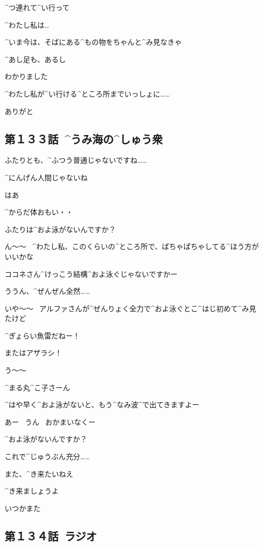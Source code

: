 \Sensei ^{つ}{連}れて^{い}{行}って

\Sensei ^{わたし}{私}は…

\Sensei ^{いま}{今}は、そばにある^{もの}{物}をちゃんと^{み}{見}なきゃ

\page[31]
\Sensei ^{あし}{足}も、あるし

\Alpha わかりました

\Alpha ^{わたし}{私}が^{い}{行}ける^{ところ}{所}までいっしょに……

\Sensei ありがと


\subsection{第１３３話\ ^{うみ}{海}の^{しゅう}{衆}}

\page[36]
\Kokone ふたりとも、^{ふつう}{普通}じゃないですね……

\Maruko ^{にんげん}{人間}じゃないね

\page[37]
\Alpha はあ

\Alpha ^{からだ}{体}おもい・・

\Makki ふたりは^{およ}{泳}がないんですか？

\Kokone ん〜〜
\ ^{わたし}{私}、このくらいの^{ところ}{所}で、ぱちゃぱちゃしてる^{ほう}{方}がいいかな

\Makki ココネさん^{けっこう}{結構}^{およ}{泳}ぐじゃないですかー

\Kokone ううん、^{ぜんぜん}{全然}……

\Makki いや〜〜
\ アルファさんが^{ぜんりょく}{全力}で^{およ}{泳}ぐとこ^{はじ}{初}めて^{み}{見}たけど

\Makki ^{ぎょらい}{魚雷}だねー！

\page[38]
\Makki またはアザラシ！

\Kokone う〜〜

\Makki ^{まる}{丸}^{こ}{子}さーん

\Makki ^{はや}{早}く^{およ}{泳}がないと、もう^{なみ}{波}^{で}{出}てきますよー

\Maruko あー
\ うん
\ おかまいなくー

\page[39]
\Makki ^{およ}{泳}がないんですか？

\Maruko これで^{じゅうぶん}{充分}……

\page[40]
\Maruko また、^{き}{来}たいねえ

\Makki ^{き}{来}ましょうよ

\Makki いつかまた


\subsection{第１３４話\ ラジオ}

